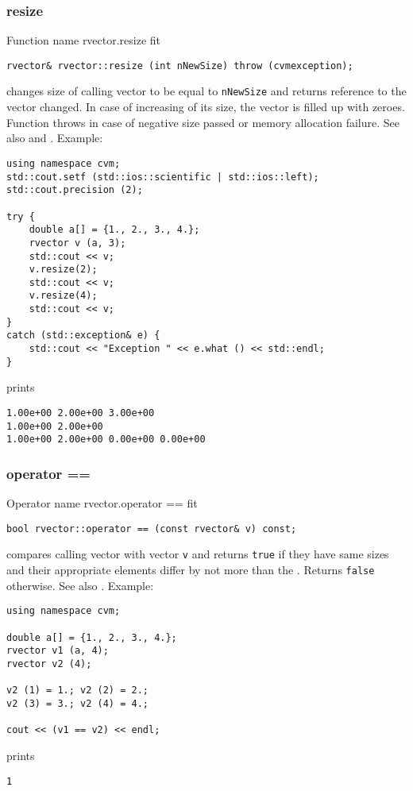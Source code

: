 \subsubsection{resize}
Function%
\pdfdest name {rvector.resize} fit
\begin{verbatim}
rvector& rvector::resize (int nNewSize) throw (cvmexception);
\end{verbatim}
changes size of calling vector to be equal to
\verb"nNewSize" and returns  reference to
the vector changed.
In case of increasing of its size, the vector
is filled up with zeroes.
Function throws  
in case of negative size passed or memory allocation failure.
See also  and
.
Example:
\begin{Verbatim}
using namespace cvm;
std::cout.setf (std::ios::scientific | std::ios::left); 
std::cout.precision (2);

try {
    double a[] = {1., 2., 3., 4.};
    rvector v (a, 3);
    std::cout << v;
    v.resize(2);
    std::cout << v;
    v.resize(4);
    std::cout << v;
}
catch (std::exception& e) {
    std::cout << "Exception " << e.what () << std::endl;
}
\end{Verbatim}
prints
\begin{Verbatim}
1.00e+00 2.00e+00 3.00e+00
1.00e+00 2.00e+00
1.00e+00 2.00e+00 0.00e+00 0.00e+00
\end{Verbatim}
\newpage


\subsubsection{operator ==}
Operator%
\pdfdest name {rvector.operator ==} fit
\begin{verbatim}
bool rvector::operator == (const rvector& v) const;
\end{verbatim}
compares calling vector with vector \verb"v"
and returns \verb"true" if they have same sizes
and their appropriate elements differ by not more than the
.
Returns \verb"false" otherwise.
See also .
Example:
\begin{Verbatim}
using namespace cvm;

double a[] = {1., 2., 3., 4.};
rvector v1 (a, 4);
rvector v2 (4);

v2 (1) = 1.; v2 (2) = 2.;
v2 (3) = 3.; v2 (4) = 4.;

cout << (v1 == v2) << endl;
\end{Verbatim}
prints
\begin{Verbatim}
1
\end{Verbatim}
\newpage




